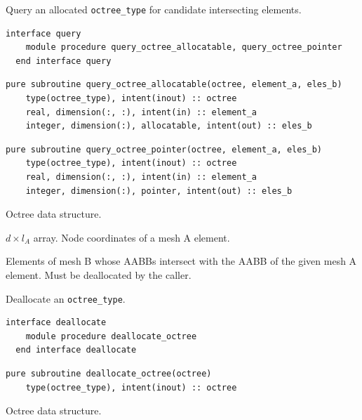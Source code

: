 \documentclass{article}
\begin{document}
\noindent Query an allocated \verb+octree_type+ for candidate intersecting
elements.
  
\begin{lstlisting}[language=FORTRAN]
  interface query
    module procedure query_octree_allocatable, query_octree_pointer
  end interface query
\end{lstlisting}
    
\begin{lstlisting}[language=FORTRAN]
  pure subroutine query_octree_allocatable(octree, element_a, eles_b)
    type(octree_type), intent(inout) :: octree
    real, dimension(:, :), intent(in) :: element_a
    integer, dimension(:), allocatable, intent(out) :: eles_b
\end{lstlisting}
  
\begin{lstlisting}[language=FORTRAN]
  pure subroutine query_octree_pointer(octree, element_a, eles_b)
    type(octree_type), intent(inout) :: octree
    real, dimension(:, :), intent(in) :: element_a
    integer, dimension(:), pointer, intent(out) :: eles_b
\end{lstlisting}

\begin{description}[font=\ttfamily\bfseries,leftmargin=2.2\parindent,labelindent=1.7\parindent,noitemsep]
  \item[octree] Octree data structure.
  \item[element\_a] $d \times l_A$ array. Node coordinates of a mesh A element.
  \item[eles\_b] Elements of mesh B whose AABBs intersect with the AABB of the
    given mesh A element. Must be deallocated by the caller.
\end{description}

\noindent Deallocate an \verb+octree_type+.
  
\begin{lstlisting}[language=FORTRAN]
  interface deallocate
    module procedure deallocate_octree
  end interface deallocate
\end{lstlisting}
  
\begin{lstlisting}[language=FORTRAN]
  pure subroutine deallocate_octree(octree)
    type(octree_type), intent(inout) :: octree
\end{lstlisting}

\begin{description}[font=\ttfamily\bfseries,leftmargin=2.2\parindent,labelindent=1.7\parindent,noitemsep]
  \item[octree] Octree data structure.
\end{description}
\end{document}
